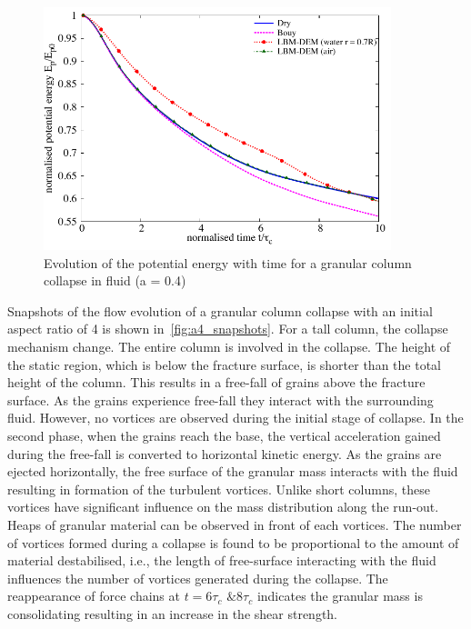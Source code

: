 \begin{figure}
	\centering
    \includegraphics[width=0.9\textwidth]{PE_a04f}
    \caption{Evolution of the potential energy with time for a granular column 
    collapse in fluid (a = 0.4)}
    \label{fig:PE_a04f}
\end{figure}


Snapshots of the flow evolution of a granular column collapse with an initial 
aspect ratio of 4 is shown in~\cref{fig:a4_snapshots}. For a tall column, the 
collapse mechanism change. The entire column is involved in the collapse. The 
height of the static region, which is below the fracture surface, is shorter 
than the total height of the column. This results in a free-fall of grains 
above the fracture surface. As the grains experience free-fall they interact 
with the surrounding fluid. However, no vortices are observed during the 
initial stage of collapse. In the second phase, when the grains reach the base, 
the vertical acceleration gained during the free-fall is converted to 
horizontal kinetic energy. As the grains are ejected horizontally, the free 
surface of the granular mass interacts with the fluid resulting in formation of 
the turbulent vortices. Unlike short columns, these vortices have significant 
influence on the mass distribution along the run-out. Heaps of granular 
material can be observed in front of each vortices. The number of vortices 
formed during a collapse is found to be proportional to the amount of material 
destabilised, i.e., the length of free-surface interacting with the fluid 
influences the number of vortices generated during the collapse. The 
reappearance of force chains at $t = 6\tau_c$ $\& 8\tau_c$ indicates the 
granular mass is consolidating resulting in an increase in the shear strength. 

